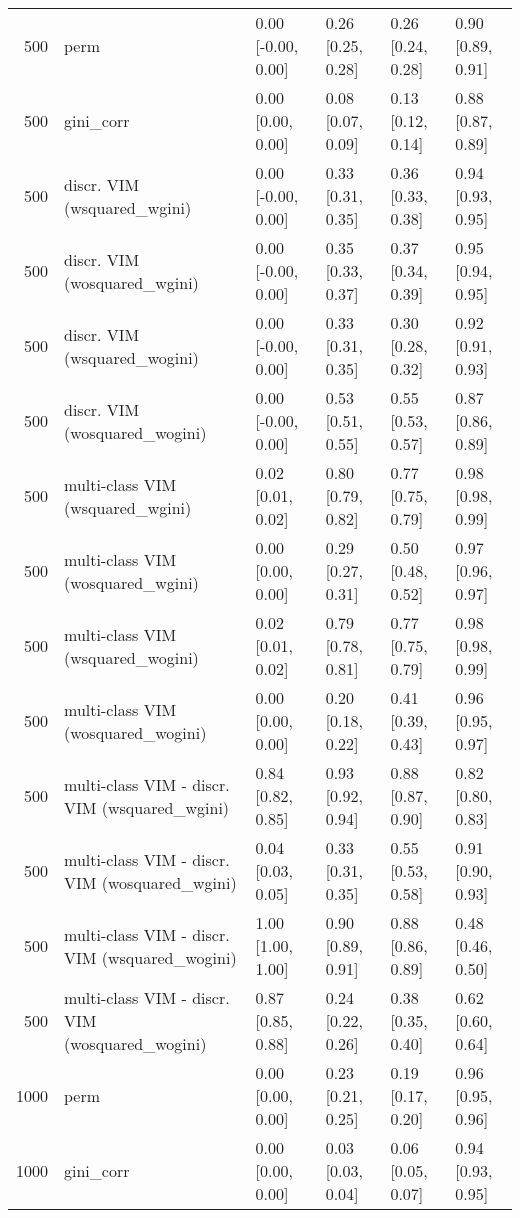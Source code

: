 \begin{table}[ht]
\begin{tabular}{rlllll}
   \hline 500 & perm & 0.00 [-0.00, 0.00] & 0.26 [0.25, 0.28] & 0.26 [0.24, 0.28] & 0.90 [0.89, 0.91] \\ 
  500 & gini\_corr & 0.00 [0.00, 0.00] & 0.08 [0.07, 0.09] & 0.13 [0.12, 0.14] & 0.88 [0.87, 0.89] \\ 
  500 & discr. VIM (wsquared\_wgini) & 0.00 [-0.00, 0.00] & 0.33 [0.31, 0.35] & 0.36 [0.33, 0.38] & 0.94 [0.93, 0.95] \\ 
  500 & discr. VIM (wosquared\_wgini) & 0.00 [-0.00, 0.00] & 0.35 [0.33, 0.37] & 0.37 [0.34, 0.39] & 0.95 [0.94, 0.95] \\ 
  500 & discr. VIM (wsquared\_wogini) & 0.00 [-0.00, 0.00] & 0.33 [0.31, 0.35] & 0.30 [0.28, 0.32] & 0.92 [0.91, 0.93] \\ 
  500 & discr. VIM (wosquared\_wogini) & 0.00 [-0.00, 0.00] & 0.53 [0.51, 0.55] & 0.55 [0.53, 0.57] & 0.87 [0.86, 0.89] \\ 
  500 & multi-class VIM (wsquared\_wgini) & 0.02 [0.01, 0.02] & 0.80 [0.79, 0.82] & 0.77 [0.75, 0.79] & 0.98 [0.98, 0.99] \\ 
  500 & multi-class VIM (wosquared\_wgini) & 0.00 [0.00, 0.00] & 0.29 [0.27, 0.31] & 0.50 [0.48, 0.52] & 0.97 [0.96, 0.97] \\ 
  500 & multi-class VIM (wsquared\_wogini) & 0.02 [0.01, 0.02] & 0.79 [0.78, 0.81] & 0.77 [0.75, 0.79] & 0.98 [0.98, 0.99] \\ 
  500 & multi-class VIM (wosquared\_wogini) & 0.00 [0.00, 0.00] & 0.20 [0.18, 0.22] & 0.41 [0.39, 0.43] & 0.96 [0.95, 0.97] \\ 
  500 & multi-class VIM - discr. VIM (wsquared\_wgini) & 0.84 [0.82, 0.85] & 0.93 [0.92, 0.94] & 0.88 [0.87, 0.90] & 0.82 [0.80, 0.83] \\ 
  500 & multi-class VIM - discr. VIM (wosquared\_wgini) & 0.04 [0.03, 0.05] & 0.33 [0.31, 0.35] & 0.55 [0.53, 0.58] & 0.91 [0.90, 0.93] \\ 
  500 & multi-class VIM - discr. VIM (wsquared\_wogini) & 1.00 [1.00, 1.00] & 0.90 [0.89, 0.91] & 0.88 [0.86, 0.89] & 0.48 [0.46, 0.50] \\ 
  500 & multi-class VIM - discr. VIM (wosquared\_wogini) & 0.87 [0.85, 0.88] & 0.24 [0.22, 0.26] & 0.38 [0.35, 0.40] & 0.62 [0.60, 0.64] \\ 
   \hline 1000 & perm & 0.00 [0.00, 0.00] & 0.23 [0.21, 0.25] & 0.19 [0.17, 0.20] & 0.96 [0.95, 0.96] \\ 
  1000 & gini\_corr & 0.00 [0.00, 0.00] & 0.03 [0.03, 0.04] & 0.06 [0.05, 0.07] & 0.94 [0.93, 0.95] \\ 

\end{tabular}
\end{table}
